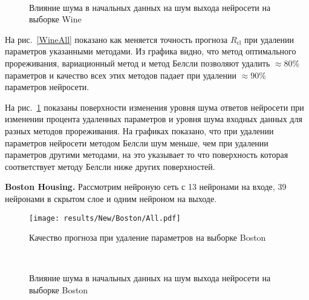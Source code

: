 \begin{figure}[h!t]\center
{}
\\
\caption{Влияние шума в начальных данных на шум выхода нейросети на выборке Wine}
\label{WineNoise}
\end{figure}

На рис.~\ref{WineAll} показано как меняется точность прогноза $R_{\text{cl}}$ при удалении параметров указанными методами. Из графика видно, что метод оптимального прореживания, вариационный метод и метод Белсли позволяют удалить $\approx80\%$ параметров и качество всех этих методов падает при удалении $\approx90\%$ параметров нейросети. 

На рис.~\ref{WineNoise} показаны поверхности изменения уровня шума ответов нейросети при изменении процента удаленных параметров и уровня шума входных данных для разных методов прореживания. На графиках показано, что при удалении параметров нейросети методом Белсли шум меньше, чем при удалении параметров другими методами, на это указывает то что поверхность которая соответствует методу Белсли ниже других поверхностей.

\textbf{Boston Housing. } Рассмотрим нейроную сеть с 13 нейронами на входе, 39 нейронами в скрытом слое и одним нейроном на выходе.

\begin{figure}[h!t]\center
\texttt{[image: results/New/Boston/All.pdf]}\\
\caption{Качество прогноза при удаление параметров на выборке Boston}
\label{BostonAll}
\end{figure}

\begin{figure}[h!t]\center
{}
\\
\caption{Влияние шума в начальных данных на шум выхода нейросети на выборке Boston}
\label{BostonNoise}
\end{figure}

